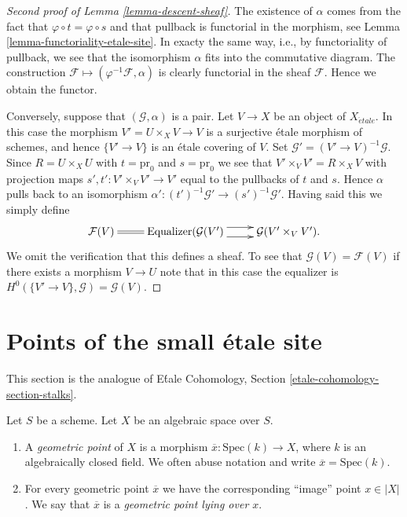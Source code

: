\begin{proof}[Second proof of Lemma \ref{lemma-descent-sheaf}]
The existence of $\alpha$ comes from the fact that
$\varphi \circ t = \varphi \circ s$ and that pullback is
functorial in the morphism, see 
Lemma \ref{lemma-functoriality-etale-site}.
In exacty the same way, i.e., by functoriality of pullback, we see
that the isomorphism $\alpha$ fits into the commutative diagram.
The construction $\mathcal{F} \mapsto (\varphi^{-1}\mathcal{F}, \alpha)$
is clearly functorial in the sheaf $\mathcal{F}$.
Hence we obtain the functor.

\medskip\noindent
Conversely, suppose that $(\mathcal{G}, \alpha)$ is a pair.
Let $V \to X$ be an object of $X_{\acute{e}tale}$.
In this case the morphism $V' = U \times_X V \to V$ is a surjective \'etale
morphism of schemes, and hence $\{V' \to V\}$ is an \'etale
covering of $V$. Set $\mathcal{G}' = (V' \to V)^{-1}\mathcal{G}$.
Since $R = U \times_X U$ with $t = \text{pr}_0$
and $s = \text{pr}_0$ we see that $V' \times_V V' = R \times_X V$
with projection maps $s', t' : V' \times_V V' \to V'$ equal to the pullbacks
of $t$ and $s$. Hence $\alpha$ pulls back to an isomorphism
$\alpha' : (t')^{-1}\mathcal{G}' \to (s')^{-1}\mathcal{G}'$. Having said this
we simply define
$$
\xymatrix{
\mathcal{F}(V) \ar@{=}[r] &
\text{Equalizer}(\mathcal{G}(V') \ar@<1ex>[r] \ar@<-1ex>[r] &
\mathcal{G}(V' \times_V V').
}
$$
We omit the verification that this defines a sheaf. To see that
$\mathcal{G}(V) = \mathcal{F}(V)$ if there exists a morphism $V \to U$
note that in this case the equalizer is
$H^0(\{V' \to V\}, \mathcal{G}) = \mathcal{G}(V)$.
\end{proof}







\section{Points of the small \'etale site}
\label{section-points-small-etale-site}

\noindent
This section is the analogue of
E\'tale Cohomology, Section \ref{etale-cohomology-section-stalks}.

\begin{definition}
\label{definition-geometric-point}
Let $S$ be a scheme. Let $X$ be an algebraic space over $S$.
\begin{enumerate}
\item A {\it geometric point} of $X$ is a morphism
$\overline{x} : \text{Spec}(k) \to X$, where $k$ is an algebraically
closed field. We often abuse notation and
write $\overline{x} = \text{Spec}(k)$.
\item For every geometric point $\overline{x}$ we have the corresponding
``image'' point $x \in |X|$. We say that $\overline{x}$ is a
{\it geometric point lying over $x$}.
\end{enumerate}
\end{definition}

